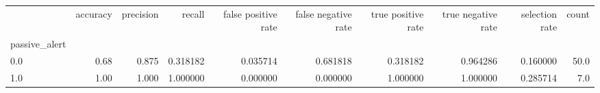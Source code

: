\begin{tabular}{lrrrrrrrrr}
\toprule
{} &  accuracy &  precision &    recall &  false positive rate &  false negative rate &  true positive rate &  true negative rate &  selection rate &  count \\
passive\_alert &           &            &           &                      &                      &                     &                     &                 &        \\
\midrule
0.0           &      0.68 &      0.875 &  0.318182 &             0.035714 &             0.681818 &            0.318182 &            0.964286 &        0.160000 &   50.0 \\
1.0           &      1.00 &      1.000 &  1.000000 &             0.000000 &             0.000000 &            1.000000 &            1.000000 &        0.285714 &    7.0 \\
\bottomrule
\end{tabular}
